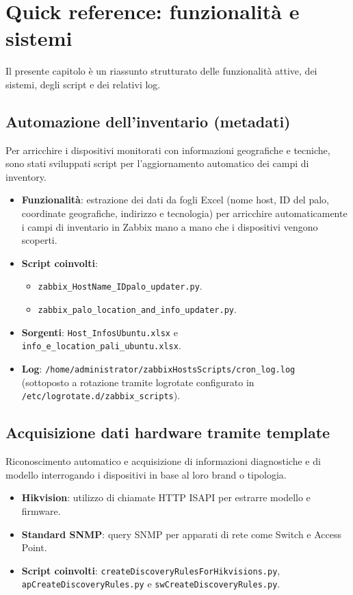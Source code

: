 \documentclass[12pt, a4paper]{report}
\begin{document}
\chapter{Quick reference: funzionalità e sistemi}
Il presente capitolo è un riassunto strutturato delle funzionalità attive, dei sistemi, degli script e dei relativi log.

\section{Automazione dell'inventario (metadati)}
Per arricchire i dispositivi monitorati con informazioni geografiche e tecniche, sono stati sviluppati script per l'aggiornamento automatico dei campi di inventory.
\begin{itemize}
    \item \textbf{Funzionalità}: estrazione dei dati da fogli Excel (nome host, ID del palo, coordinate geografiche, indirizzo e tecnologia)
     per arricchire automaticamente i campi di inventario in Zabbix mano a mano che i dispositivi vengono scoperti.
    \item \textbf{Script coinvolti}:
    \begin{itemize}
        \item \texttt{zabbix\_HostName\_IDpalo\_updater.py}.
        \item \texttt{zabbix\_palo\_location\_and\_info\_updater.py}.
    \end{itemize}
    \item \textbf{Sorgenti}: \texttt{Host\_InfosUbuntu.xlsx} e \\\texttt{info\_e\_location\_pali\_ubuntu.xlsx}.
    \item \textbf{Log}: \texttt{/home/administrator/zabbixHostsScripts/cron\_log.log} \\(sottoposto a rotazione tramite logrotate configurato in \\\texttt{/etc/logrotate.d/zabbix\_scripts}).
\end{itemize}

\section{Acquisizione dati hardware tramite template}
Riconoscimento automatico e acquisizione di informazioni diagnostiche e di modello interrogando i dispositivi in base al loro brand o tipologia.
\begin{itemize}
    \item \textbf{Hikvision}: utilizzo di chiamate HTTP ISAPI per estrarre modello e firmware.
    \item \textbf{Standard SNMP}: query SNMP per apparati di rete come Switch e Access Point.
    \item \textbf{Script coinvolti}: \texttt{createDiscoveryRulesForHikvisions.py}, \\\texttt{apCreateDiscoveryRules.py} e \texttt{swCreateDiscoveryRules.py}.
\end{itemize}
\end{document}
